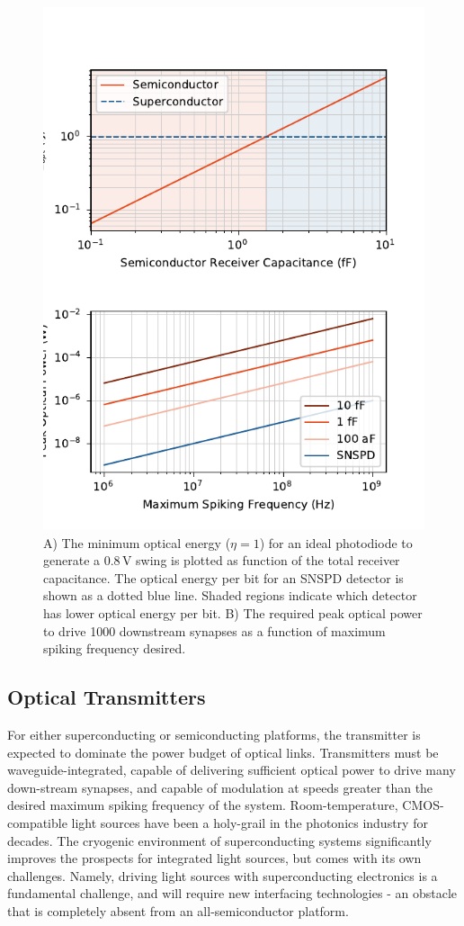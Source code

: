 \documentclass[twocolumn]{article}
\begin{document}
\begin{figure}
    \centering
    \includegraphics[scale=1]{opticalv2.pdf}
    \caption{A) The minimum optical energy ($\eta = 1$) for an ideal photodiode to generate a 0.8\,V swing is plotted as function of the total receiver capacitance. The optical energy per bit for an SNSPD detector is shown as a dotted blue line. Shaded regions indicate which detector has lower optical energy per bit. B) The required peak optical power to drive 1000 downstream synapses as a function of maximum spiking frequency desired.}
    \label{fig:communication}
\end{figure}


\subsection{Optical Transmitters}
For either superconducting or semiconducting platforms, the transmitter is expected to dominate the power budget of optical links. Transmitters must be waveguide-integrated, capable of delivering sufficient optical power to drive many down-stream synapses, and capable of modulation at speeds greater than the desired maximum spiking frequency of the system. Room-temperature, CMOS-compatible light sources have been a holy-grail in the photonics industry for decades. The cryogenic environment of superconducting systems significantly improves the prospects for integrated light sources, but comes with its own challenges. Namely, driving light sources with superconducting electronics is a fundamental challenge, and will require new interfacing technologies - an obstacle that is completely absent from an all-semiconductor platform.
\end{document}
